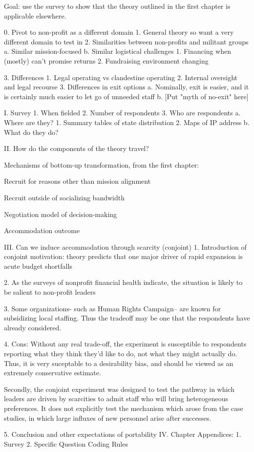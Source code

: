 Goal: use the survey to show that the theory outlined in the first chapter is applicable elsewhere.

0. Pivot to non-profit as a different domain
1. General theory so want a very different domain to test in
2. Similarities between non-profits and militant groups
    a. Similar mission-focused
    b. Similar logistical challenges
        1. Financing when (mostly) can't promise returns
        2. Fundraising environment changing

3. Differences
    1. Legal operating vs clandestine operating
    2. Internal oversight and legal recourse
    3. Differences in exit options
        a. Nominally, exit is easier, and it is certainly much easier to let go of unneeded staff
        b. [Put "myth of no-exit" here]
        
    
I. Survey
1. When fielded
2. Number of respondents
3. Who are respondents
    a. Where are they?
        1. Summary tables of state distribution
        2. Maps of IP address
    b. What do they do?
    
II. How do the components of the theory travel?

Mechanisms of bottom-up transformation, from the first chapter:
\item Recruit for reasons other than mission alignment
\item Recruit outside of socializing bandwidth 
\item Negotiation model of decision-making
\item Accommodation outcome


III. Can we induce accommodation through scarcity (conjoint)
1. Introduction of conjoint motivation: theory predicts that one major driver of rapid  expansion is acute budget shortfalls

2. As the surveys of nonprofit financial health indicate, the situation is likely to be salient to non-profit leaders

3. Some organizations- such as Human Rights Campaign-- are known for subsidizing local staffing. Thus the tradeoff may be one that the respondents have already considered.

4. Cons: Without any real trade-off, the experiment is susceptible to respondents reporting what they think they'd like to do, not what they might actually do. Thus, it is very suceptable to a desirability bias, and should be viewed as an extremely conservative estimate.

Secondly, the conjoint experiment was designed to test the pathway in which leaders are driven by scarcities to admit staff who will bring heterogeneous preferences. It does not explicitly test the mechanism which arose from the case studies, in which large influxes of new personnel arise after successes.


5. Conclusion and other expectations of portability
IV. Chapter Appendices:
    1. Survey
    2. Specific Question Coding Rules